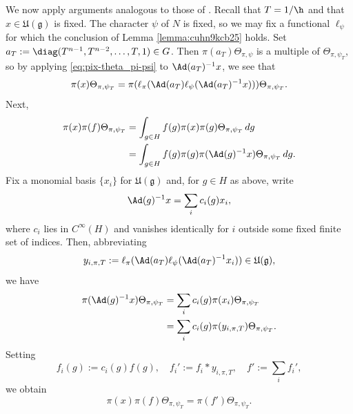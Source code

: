 We now apply arguments analogous to those of \cite[Proof of Lemma 5]{MR2733072}.  Recall that $T = 1/\h$ and that $x \in \mathfrak{U}(\mathfrak{g})$ is fixed.  The character $\psi$ of $N$ is fixed, so we may fix a functional $\ell_\psi$ for which the conclusion of Lemma \ref{lemma:cuhn9kcb25} holds.  Set $a_T := \diag(T^{n-1}, T^{n-2}, \dotsc, T, 1) \in G$.  Then $\pi(a_T) \Theta_{\pi,\psi}$ is a multiple of $\Theta_{\pi,\psi_T}$, so by applying \eqref{eq:pix-theta_pi-psi} to $\Ad(a_T)^{-1} x$, we see that
\begin{equation*}
  \pi(x) \Theta_{\pi,\psi_T} = \pi (\ell_\pi(\Ad(a_T) \ell_\psi(\Ad(a_T)^{-1} x))) \Theta_{\pi,\psi_T}.
\end{equation*}
Next,
\begin{align*}
  \pi(x) \pi(f) \Theta_{\pi,\psi_T} &= \int_{g \in H} f(g) \pi(x) \pi(g) \Theta_{\pi,\psi_T} \, d g \\
                      &= \int_{g \in H} f(g) \pi(g) \pi(\Ad(g)^{-1}  x) \Theta_{\pi,\psi_T} \, d g.
\end{align*}
Fix a monomial basis $\{x_i\}$ for $\mathfrak{U}(\mathfrak{g})$ and, for $g \in H$ as above, write
\begin{equation*}
  \Ad(g)^{-1} x = \sum_i c_i(g) x_i,
\end{equation*}
where $c_i$ lies in $C^\infty(H)$ and vanishes identically for $i$ outside some fixed finite set of indices.  Then, abbreviating
\begin{equation}\label{eq:cui0yocikh}
  y_{i,\pi,T} :=  \ell_\pi(\Ad(a_T) \ell_\psi(\Ad(a_T)^{-1} x_i)) \in \mathfrak{U}(\mathfrak{g}),
\end{equation}
we have
\begin{align*}
  \pi(\Ad(g)^{-1}  x) \Theta_{\pi,\psi_T}
  &=
    \sum_i c_i(g) \pi(x_i) \Theta_{\pi,\psi_T} \\
  &=
    \sum_i
    c_i(g) \pi (y_{i,\pi,T}) \Theta_{\pi,\psi_T}.
\end{align*}
Setting
\begin{equation*}
  f_i(g) := c_i(g) f(g), \quad
  f_i' := f_i \ast y_{i,\pi,T},
  \quad
  f' := \sum_i f_i',
\end{equation*}
we obtain
\begin{equation}\label{eq:pix-pif-theta_pi}
  \pi(x) \pi(f) \Theta_{\pi,\psi_T} = \pi(f') \Theta_{\pi,\psi_T}.
\end{equation}


